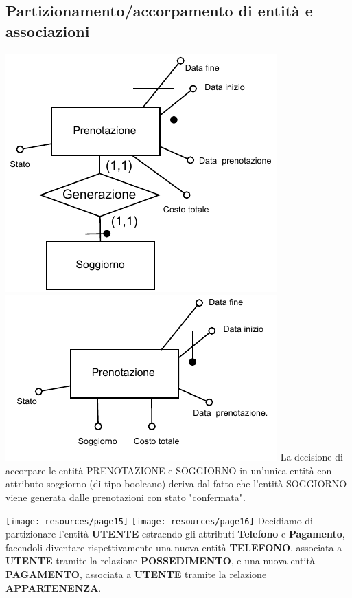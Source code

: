 \subsection{Partizionamento/accorpamento di entità e associazioni}
\includegraphics[width=\textwidth]{resources/page13}
\includegraphics[width=\textwidth]{resources/page14}
La decisione di accorpare le entità PRENOTAZIONE e SOGGIORNO in un'unica entità con attributo soggiorno (di tipo booleano) deriva dal fatto che l'entità SOGGIORNO viene generata dalle prenotazioni con stato "confermata".

\texttt{[image: resources/page15]}
\texttt{[image: resources/page16]}
Decidiamo di partizionare l'entità \textbf{UTENTE} estraendo gli attributi \textbf{Telefono} e \textbf{Pagamento}, facendoli diventare rispettivamente una nuova entità \textbf{TELEFONO}, associata a \textbf{UTENTE} tramite la relazione \textbf{POSSEDIMENTO}, e una nuova entità \textbf{PAGAMENTO}, associata a \textbf{UTENTE} tramite la relazione \textbf{APPARTENENZA}.

